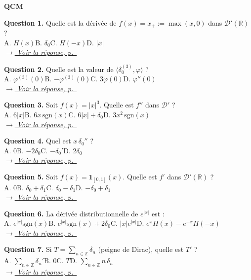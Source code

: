 \documentclass[12pt,a4paper,openany]{book}
\theoremstyle{definition}
\theoremstyle{plain}
\theoremstyle{remark}
\newenvironment{qcmblock}{%
	\begin{mdframed}[linewidth=0.5pt, linecolor=black!35,
		backgroundcolor=gray!5,
		skipabove=12pt, skipbelow=12pt,
		innerleftmargin=12pt, innerrightmargin=8pt,
		innertopmargin=8pt, innerbottommargin=8pt]%
		\noindent\textbf{\scshape QCM}\par\smallskip%
	}{%
	\end{mdframed}%
}
\newcommand{\navtoQCMRep}[2]{%
	\vspace{2pt}%
	\noindent\hfill{\small\itshape%
		\hyperlink{qcmrep:#1:q#2}{$\rightarrow$ Voir la réponse, p.~\pageref*{qcmrep:#1:q#2}}%
	}%
	\vspace{6pt}%
}
\begin{document}
	\begin{qcmblock}
		\hypertarget{qcm:ch3:start}{}\label{qcm:ch3:start}
		\hypertarget{qcm:ch3:q1}{}\label{qcm:ch3:q1}
		\textbf{Question 1.} Quelle est la dérivée de $f(x) = x_+ := \max(x,0)$ dans $\mathcal{D}'(\mathbb{R})$ ?\\
		A. $H(x)$\quad B. $\delta_0$\quad C. $H(-x)$\quad D. $|x|$\\
		\navtoQCMRep{ch3}{1}
		
		\medskip
		\hypertarget{qcm:ch3:q2}{}\label{qcm:ch3:q2}
		\textbf{Question 2.} Quelle est la valeur de $\langle \delta_0^{(3)}, \varphi \rangle$ ?\\
		A. $\varphi^{(3)}(0)$\quad B. $-\varphi^{(3)}(0)$\quad C. $3\varphi(0)$\quad D. $\varphi''(0)$\\
		\navtoQCMRep{ch3}{2}
		
		\medskip
		\hypertarget{qcm:ch3:q3}{}\label{qcm:ch3:q3}
		\textbf{Question 3.} Soit $f(x) = |x|^3$. Quelle est $f''$ dans $\mathcal{D}'$ ?\\
		A. $6|x|$\quad B. $6x\,\mathrm{sgn}(x)$\quad C. $6|x| + \delta_0$\quad D. $3x^2\,\mathrm{sgn}(x)$\\
		\navtoQCMRep{ch3}{3}
		
		\medskip
		\hypertarget{qcm:ch3:q4}{}\label{qcm:ch3:q4}
		\textbf{Question 4.} Quel est $x\,\delta_0''$ ?\\
		A. $0$\quad B. $-2\delta_0$\quad C. $-\delta_0'$\quad D. $2\delta_0$\\
		\navtoQCMRep{ch3}{4}
		
		\medskip
		\hypertarget{qcm:ch3:q5}{}\label{qcm:ch3:q5}
		\textbf{Question 5.} Soit $f(x) = \mathbf{1}_{[0,1]}(x)$. Quelle est $f'$ dans $\mathcal{D}'(\mathbb{R})$ ?\\
		A. $0$\quad B. $\delta_0 + \delta_1$\quad C. $\delta_0 - \delta_1$\quad D. $-\delta_0 + \delta_1$\\
		\navtoQCMRep{ch3}{5}
		
		\medskip
		\hypertarget{qcm:ch3:q6}{}\label{qcm:ch3:q6}
		\textbf{Question 6.} La dérivée distributionnelle de $e^{|x|}$ est :\\
		A. $e^{|x|}\mathrm{sgn}(x)$\quad B. $e^{|x|}\mathrm{sgn}(x) + 2\delta_0$\quad C. $|x|e^{|x|}$\quad D. $e^x H(x) - e^{-x}H(-x)$\\
		\navtoQCMRep{ch3}{6}
		
		\medskip
		\hypertarget{qcm:ch3:q7}{}\label{qcm:ch3:q7}
		\textbf{Question 7.} Si $T = \displaystyle\sum_{n \in \mathbb{Z}} \delta_n$ (peigne de Dirac), quelle est $T'$ ?\\
		A. $\displaystyle\sum_{n\in\mathbb{Z}}\delta_n'$\quad B. $0$\quad C. $T$\quad D. $\displaystyle\sum_{n\in\mathbb{Z}} n\,\delta_n$\\
		\navtoQCMRep{ch3}{7}
		

\end{qcmblock}
\end{document}
